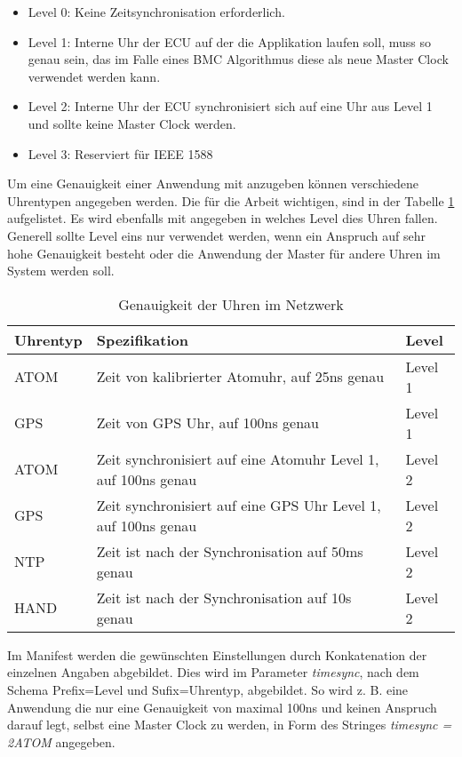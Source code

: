 \begin{itemize}
	\item Level 0: Keine Zeitsynchronisation erforderlich.
	\item Level 1: Interne Uhr der \ac{ECU} auf der die Applikation laufen soll, muss so genau sein, das im Falle eines \ac{BMC} Algorithmus diese als neue Master Clock verwendet werden kann.
	\item Level 2: Interne Uhr der \ac{ECU} synchronisiert sich auf eine Uhr aus Level 1 und sollte keine Master Clock werden.
	\item Level 3: Reserviert für IEEE 1588
\end{itemize}

Um eine Genauigkeit einer Anwendung mit anzugeben können verschiedene Uhrentypen angegeben werden. Die für die Arbeit wichtigen, sind in der Tabelle \ref{tab:clock} aufgelistet. Es wird ebenfalls mit angegeben in welches Level dies Uhren fallen. Generell sollte Level eins nur verwendet werden, wenn ein Anspruch auf sehr hohe Genauigkeit besteht oder die Anwendung der Master für andere Uhren im System werden soll.

\begin{table}[!htb]
	\centering
	\begin{tabularx}{0.85\textwidth}{p{} | p{} | p{}}
		Uhrentyp & Spezifikation & Level\\
		\hline\hline
		ATOM & Zeit von kalibrierter Atomuhr, auf 25ns genau & Level 1 \\
		GPS & Zeit von GPS Uhr, auf 100ns genau & Level 1 \\
		ATOM & Zeit synchronisiert auf eine Atomuhr Level 1, 
		\newline auf 100ns genau & Level 2 \\
		GPS & Zeit synchronisiert auf eine GPS Uhr Level 1, 
		\newline auf 100ns genau & Level 2 \\
		NTP & Zeit ist nach der Synchronisation auf 50ms genau & Level 2 \\
		HAND & Zeit ist nach der Synchronisation auf 10s genau & Level 2 \\
	\end{tabularx}
	\caption[Genauigkeit der Uhren im Netzwerk]{Genauigkeit der Uhren im Netzwerk \cite{BMC}}
	\label{tab:clock}
\end{table}

\newpage

Im Manifest werden die gewünschten Einstellungen durch Konkatenation der einzelnen Angaben abgebildet. Dies wird im Parameter \emph{timesync}, nach dem Schema Prefix=Level und Sufix=Uhrentyp, abgebildet. So wird z. B. eine Anwendung die nur eine Genauigkeit von maximal 100ns und keinen Anspruch darauf legt, selbst eine Master Clock zu werden, in Form des Stringes \emph{timesync = 2ATOM} angegeben.



